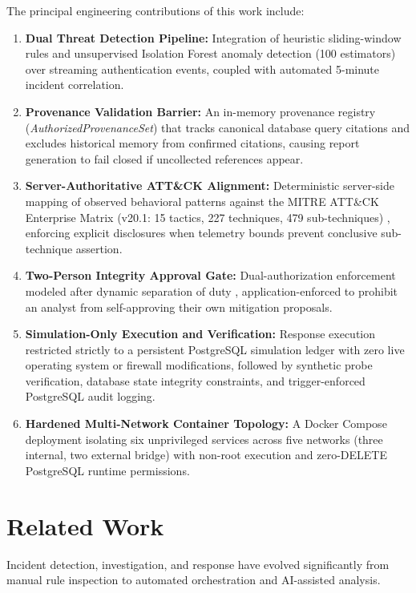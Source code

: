 \documentclass[conference]{IEEEtran}
\begin{document}
The principal engineering contributions of this work include:
\begin{enumerate}
    \item \textbf{Dual Threat Detection Pipeline:} Integration of heuristic sliding-window rules and unsupervised Isolation Forest anomaly detection (100 estimators) over streaming authentication events, coupled with automated 5-minute incident correlation.
    \item \textbf{Provenance Validation Barrier:} An in-memory provenance registry (\textit{AuthorizedProvenanceSet}) that tracks canonical database query citations and excludes historical memory from confirmed citations, causing report generation to fail closed if uncollected references appear.
    \item \textbf{Server-Authoritative ATT\&CK Alignment:} Deterministic server-side mapping of observed behavioral patterns against the MITRE ATT\&CK Enterprise Matrix (v20.1: 15 tactics, 227 techniques, 479 sub-techniques) \cite{mitre2026attack, strom2018mitre}, enforcing explicit disclosures when telemetry bounds prevent conclusive sub-technique assertion.
    \item \textbf{Two-Person Integrity Approval Gate:} Dual-authorization enforcement modeled after dynamic separation of duty \cite{saltzer1975protection, ahn2000role}, application-enforced to prohibit an analyst from self-approving their own mitigation proposals.
    \item \textbf{Simulation-Only Execution and Verification:} Response execution restricted strictly to a persistent PostgreSQL simulation ledger with zero live operating system or firewall modifications, followed by synthetic probe verification, database state integrity constraints, and trigger-enforced PostgreSQL audit logging.
    \item \textbf{Hardened Multi-Network Container Topology:} A Docker Compose deployment isolating six unprivileged services across five networks (three internal, two external bridge) with non-root execution and zero-DELETE PostgreSQL runtime permissions.
\end{enumerate}

\section{Related Work}
Incident detection, investigation, and response have evolved significantly from manual rule inspection to automated orchestration and AI-assisted analysis.
\end{document}
